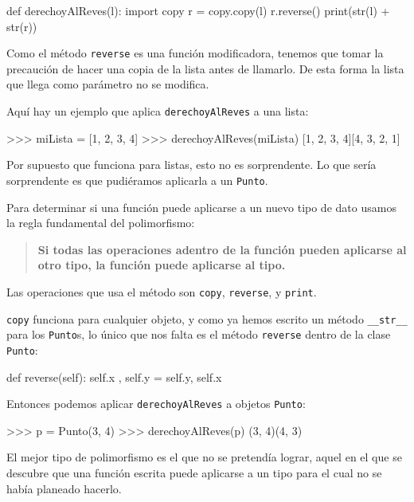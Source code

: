 \begin{pythoncode}
def derechoyAlReves(l):
  import copy
  r = copy.copy(l)
  r.reverse()
  print(str(l) + str(r))
\end{pythoncode}
 Como el método \texttt{reverse} es una función modificadora, tenemos
que tomar la precaución de hacer una copia de la lista antes de llamarlo.
De esta forma la lista que llega como parámetro no se modifica.

Aquí hay un ejemplo que aplica \texttt{derechoyAlReves} a una lista:

\begin{pyconcode}
>>> miLista = [1, 2, 3, 4]
>>> derechoyAlReves(miLista)
[1, 2, 3, 4][4, 3, 2, 1]
\end{pyconcode}
 Por supuesto que funciona para listas, esto no es sorprendente. Lo
que sería sorprendente es que pudiéramos aplicarla a un \texttt{Punto}.

Para determinar si una función puede aplicarse a un nuevo tipo de
dato usamos la regla fundamental del polimorfismo:
\begin{quote}
\textbf{Si todas las operaciones adentro de la función pueden aplicarse
al otro tipo, la función puede aplicarse al tipo.} 
\end{quote}
Las operaciones que usa el método son \texttt{copy}, \texttt{reverse},
y \texttt{print}.

\texttt{copy} funciona para cualquier objeto, y como ya hemos escrito
un método \texttt{\_\_str\_\_} para los \texttt{Punto}s, lo único
que nos falta es el método \texttt{reverse} dentro de la clase \texttt{Punto}:

\begin{pythoncode}
def reverse(self):
  self.x , self.y = self.y, self.x
\end{pythoncode}
 Entonces podemos aplicar \texttt{derechoyAlReves} a objetos \texttt{Punto}:

\begin{pyconcode}
>>>   p = Punto(3, 4)
>>>   derechoyAlReves(p)
(3, 4)(4, 3)
\end{pyconcode}
 El mejor tipo de polimorfismo es el que no se pretendía lograr, aquel
en el que se descubre que una función escrita puede aplicarse a un
tipo para el cual no se había planeado hacerlo.

